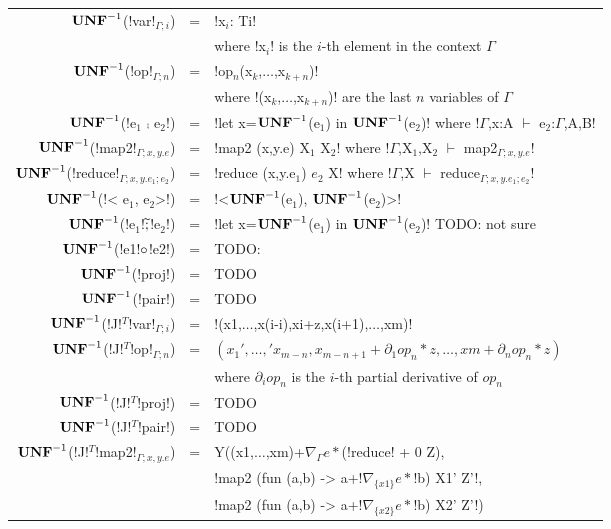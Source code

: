 \begin{figure*}[t]
    \begin{tabular}{r c l}
    $\mathbf{UNF}^{-1}$(!var!$_{\Gamma;i}$) &=& !x$_i$: Ti! \\
    && where !x$_i$! is the $i$-th element in the context $\Gamma$ \\
    $\mathbf{UNF}^{-1}$(!op!$_{\Gamma;n}$) &=& !op$_n$(x$_k$,$\ldots$,x$_{k+n}$)! \\
    && where !(x$_k$,$\ldots$,x$_{k+n}$)! are the last $n$ variables of $\Gamma$ \\ 
    $\mathbf{UNF}^{-1}$(!e$_1$ $\comp$ e$_2$!) &=& !let x=$\mathbf{UNF}^{-1}$(e$_1$) in $\mathbf{UNF}^{-1}$(e$_2$)! where !$\Gamma$,x:A $\vdash$ e$_2$:$\Gamma$,A,B! \\ 
    $\mathbf{UNF}^{-1}$(!map2!$_{\Gamma;x,y.e}$) &=& !map2 (x,y.e) X$_1$ X$_2$! where !$\Gamma$,X$_1$,X$_2$ $\vdash$ map2$_{\Gamma;x,y.e}$! \\
    $\mathbf{UNF}^{-1}$(!reduce!$_{\Gamma;x,y.e_1;e_2}$) &=& !reduce (x,y.e$_1$) $e_2$ X! where !$\Gamma$,X $\vdash$ reduce$_{\Gamma;x,y.e_1;e_2}$! \\ 
    $\mathbf{UNF}^{-1}$(!< e$_1$, e$_2$>!) &=& !<$\mathbf{UNF}^{-1}$(e$_1$), $\mathbf{UNF}^{-1}$(e$_2$)>! \\
    $\mathbf{UNF}^{-1}$(!e$_1$!$\widetilde{;}$!e$_2$!) &=& !let x=$\mathbf{UNF}^{-1}$(e$_1$) in $\mathbf{UNF}^{-1}$(e$_2$)! TODO: not sure \\
    $\mathbf{UNF}^{-1}$(!e1!$\circ$!e2!) &=& TODO: \\
    $\mathbf{UNF}^{-1}$(!proj!) &=& TODO \\
    $\mathbf{UNF}^{-1}$(!pair!) &=& TODO \\
    $\mathbf{UNF}^{-1}$(!J!$^T$!var!$_{\Gamma;i}$) &=& !(x1,$\ldots$,x(i-i),xi+z,x(i+1),$\ldots$,xm)! \\
    $\mathbf{UNF}^{-1}$(!J!$^T$!op!$_{\Gamma;n}$) &=& $(x_1',\ldots,'x_{m-n},x_{m-n+1}+\partial_1op_n*z,\ldots,xm+\partial_nop_n*z)$ \\
    && where $\partial_iop_n$ is the $i$-th partial derivative of $op_n$ \\
    $\mathbf{UNF}^{-1}$(!J!$^T$!proj!) &=& TODO \\
    $\mathbf{UNF}^{-1}$(!J!$^T$!pair!) &=& TODO \\
    $\mathbf{UNF}^{-1}$(!J!$^T$!map2!$_{\Gamma;x,y.e}$) &=&  Y((x1,$\ldots$,xm)+$\nabla_{\Gamma}e *$(!reduce! + 0 Z),\\
    && !map2 (fun (a,b) -> a+!$\nabla_{\{x1\}}e *$!b) X1' Z'!, \\
    && !map2 (fun (a,b) -> a+!$\nabla_{\{x2\}}e *$!b) X2' Z'!) \\

\end{tabular}
\end{figure*}
